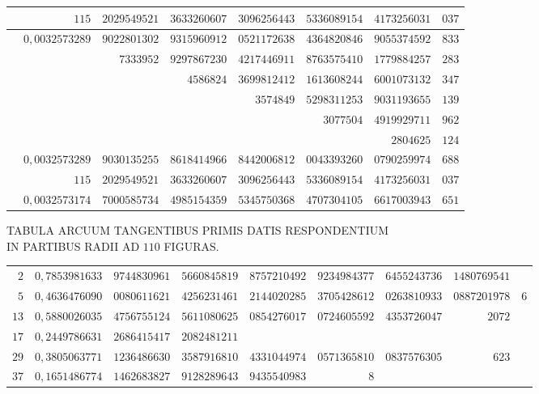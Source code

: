 \begin{longtable}{@{}rrrrrrrr@{}}
\hline
 & $115$ & $2029549521$ & $3633260607$ & $3096256443$ & $5336089154$ & $4173256031$ & $037$\\
\hline
 & $0{,}0032573289$ & $9022801302$ & $9315960912$ & $0521172638$ & $4364820846$ & $9055374592$ & $833$\\
 &  & $7333952$ & $9297867230$ & $4217446911$ & $8763575410$ & $1779884257$ & $283$\\
 &  &  & $4586824$ & $3699812412$ & $1613608244$ & $6001073132$ & $347$\\
 &  &  &  & $3574849$ & $5298311253$ & $9031193655$ & $139$\\
 &  &  &  &  & $3077504$ & $4919929711$ & $962$\\
 &  &  &  &  &  & $2804625$ & $124$\\
\hline
 & $0{,}0032573289$ & $9030135255$ & $8618414966$ & $8442006812$ & $0043393260$ & $0790259974$ & $688$\\
 & $115$ & $2029549521$ & $3633260607$ & $3096256443$ & $5336089154$ & $4173256031$ & $037$\\
\hline
 & $0{,}0032573174$ & $7000585734$ & $4985154359$ & $5345750368$ & $4707304105$ & $6617003943$ & $651$\\
\end{longtable}\endgroup
\par{}
\begin{center}\small TABULA ARCUUM TANGENTIBUS PRIMIS DATIS RESPONDENTIUM\\
IN PARTIBUS RADII AD $110$ FIGURAS.\end{center}
\begingroup\fontsize{8.5}{11}\selectfont\setlength{\tabcolsep}{1.5pt}
\begin{longtable}{@{}r|rrrrrrrr@{}}
\hline
$2$ & $0{,}7853981633$ & $9744830961$ & $5660845819$ & $8757210492$ & $9234984377$ & $6455243736$ & $1480769541$ & \\
$5$ & $0{,}4636476090$ & $0080611621$ & $4256231461$ & $2144020285$ & $3705428612$ & $0263810933$ & $0887201978$ & $6$\\
$13$ & $0{,}5880026035$ & $4756755124$ & $5611080625$ & $0854276017$ & $0724605592$ & $4353726047$ & $2072$ & \\
$17$ & $0{,}2449786631$ & $2686415417$ & $2082481211$ &  &  &  &  & \\
$29$ & $0{,}3805063771$ & $1236486630$ & $3587916810$ & $4331044974$ & $0571365810$ & $0837576305$ & $623$ & \\
$37$ & $0{,}1651486774$ & $1462683827$ & $9128289643$ & $9435540983$ & $8$ &  &  & \\
\end{longtable}\endgroup
